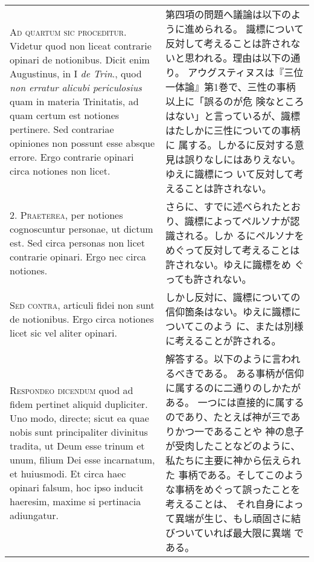 \documentclass[10pt]{jsarticle} %
\begin{document}
\begin{longtable}{p{21em}p{21em}}

{\scshape Ad quartum sic proceditur}. Videtur quod non liceat contrarie opinari
de notionibus. Dicit enim Augustinus, in I {\itshape de Trin}., quod {\itshape non erratur
alicubi periculosius} quam in materia Trinitatis, ad quam certum est
notiones pertinere. Sed contrariae opiniones non possunt esse absque
errore. Ergo contrarie opinari circa notiones non licet.

&

第四項の問題へ議論は以下のように進められる。
識標について反対して考えることは許されないと思われる。理由は以下の通り。
アウグスティヌスは『三位一体論』第1巻で、三性の事柄以上に「誤るのが危
 険なところはない」と言っているが、識標はたしかに三性についての事柄に
 属する。しかるに反対する意見は誤りなしにはありえない。ゆえに識標につ
 いて反対して考えることは許されない。

\\



2. {\scshape Praeterea}, per notiones cognoscuntur personae, ut dictum est. Sed
circa personas non licet contrarie opinari. Ergo nec circa notiones.

&

さらに、すでに述べられたとおり、識標によってペルソナが認識される。しか
 るにペルソナをめぐって反対して考えることは許されない。ゆえに識標をめ
 ぐっても許されない。

\\



{\scshape Sed contra}, articuli fidei non sunt de notionibus. Ergo circa notiones
licet sic vel aliter opinari.

&

しかし反対に、識標についての信仰箇条はない。ゆえに識標についてこのよう
 に、または別様に考えることが許される。

\\



{\scshape Respondeo dicendum} quod ad fidem pertinet aliquid dupliciter. Uno
modo, directe; sicut ea quae nobis sunt principaliter divinitus
tradita, ut Deum esse trinum et unum, filium Dei esse incarnatum, et
huiusmodi. Et circa haec opinari falsum, hoc ipso inducit haeresim,
maxime si pertinacia adiungatur. 


&

解答する。以下のように言われるべきである。
ある事柄が信仰に属するのに二通りのしかたがある。
一つには直接的に属するのであり、たとえば神が三でありかつ一であることや
 神の息子が受肉したことなどのように、私たちに主要に神から伝えられた
 事柄である。そしてこのような事柄をめぐって誤ったことを考えることは、
 それ自身によって異端が生じ、もし頑固さに結びついていれば最大限に異端
 である。


\end{longtable}
\end{document}
